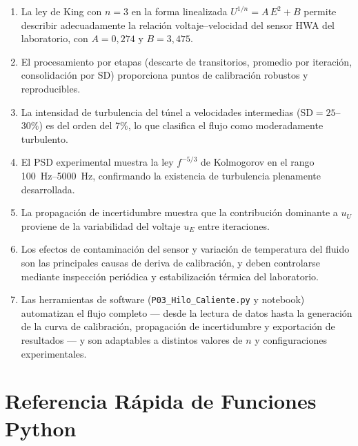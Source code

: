 \documentclass[12pt,a4paper]{article}
\begin{document}
\begin{enumerate}
	\item La ley de King con $n = 3$ en la forma linealizada
	      $U^{1/n} = A\,E^2 + B$ permite describir adecuadamente la relación
	      voltaje--velocidad del sensor HWA del laboratorio, con
	      $A = 0{,}274$ y $B = 3{,}475$.
	\item El procesamiento por etapas (descarte de transitorios, promedio por
	      iteración, consolidación por SD) proporciona puntos de calibración
	      robustos y reproducibles.
	\item La intensidad de turbulencia del túnel a velocidades intermedias
	      ($\mathrm{SD} = 25$--$30\%$) es del orden del 7\%, lo que clasifica
	      el flujo como moderadamente turbulento.
	\item El PSD experimental muestra la ley $f^{-5/3}$ de Kolmogorov en el
	      rango \SIrange{100}{5000}{\Hz}, confirmando la existencia de
	      turbulencia plenamente desarrollada.
	\item La propagación de incertidumbre muestra que la contribución
	      dominante a $u_U$ proviene de la variabilidad del voltaje $u_E$
	      entre iteraciones.
	\item Los efectos de contaminación del sensor y variación de temperatura
	      del fluido son las principales causas de deriva de calibración, y
	      deben controlarse mediante inspección periódica y estabilización
	      térmica del laboratorio.
	\item Las herramientas de software (\texttt{P03\_Hilo\_Caliente.py} y
	      notebook) automatizan el flujo completo --- desde la lectura de
	      datos hasta la generación de la curva de calibración, propagación
	      de incertidumbre y exportación de resultados --- y son adaptables
	      a distintos valores de $n$ y configuraciones experimentales.
\end{enumerate}

\printbibliography[title={Referencias}]

\appendix
\section{Referencia Rápida de Funciones Python}
\label{sec:appendix_python}
\end{document}
